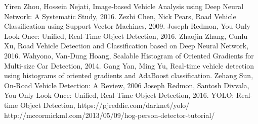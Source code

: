 \documentclass[conference]{IEEEtran}
\begin{document}


%
%
%
\begin{thebibliography}{8}
Yiren Zhou, Hossein Nejati, Image-based Vehicle Analysis using Deep Neural
Network: A Systematic Study, 2016.
Zezhi Chen, Nick Pears, Road Vehicle Classification using Support Vector Machines, 2009.
Joseph Redmon, You Only Look Once: Unified, Real-Time Object Detection, 2016.
Zhaojin Zhang, Cunlu Xu, Road Vehicle Detection and Classification based on Deep Neural Network, 2016.
Wahyono, Van-Dung Hoang, Scalable Histogram of Oriented Gradients for Multi-size Car Detection, 2014.
Gang Yan, Ming Yu, Real-time vehicle detection using histograms of oriented gradients and AdaBoost classification.
Zehang Sun, On-Road Vehicle Detection: A Review, 2006
Joseph Redmon, Santosh Divvala, You Only Look Once: Unified, Real-Time Object Detection, 2016.
YOLO: Real-time Object Detection, https://pjreddie.com/darknet/yolo/
http://mccormickml.com/2013/05/09/hog-person-detector-tutorial/
\end{thebibliography}

% 
\end{document}
